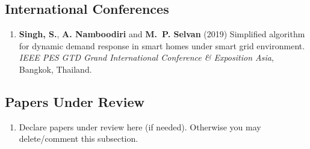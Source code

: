 \documentclass[12pt,a4paper, twoside]{report}
\begin{document}
\subsection*{International Conferences}
\begin{enumerate}
\item \textbf{Singh, S.}, \textbf{A. Namboodiri} and \textbf{M.~P. Selvan} (2019) Simplified algorithm for dynamic demand response in smart homes under smart grid environment. \textit{IEEE PES GTD Grand International Conference \& Exposition Asia}, Bangkok, Thailand.
\end{enumerate}

\subsection*{Papers Under Review}
\begin{enumerate}
\item Declare papers under review here (if needed). Otherwise you may delete/comment this subsection.
\end{enumerate}
\end{document}

